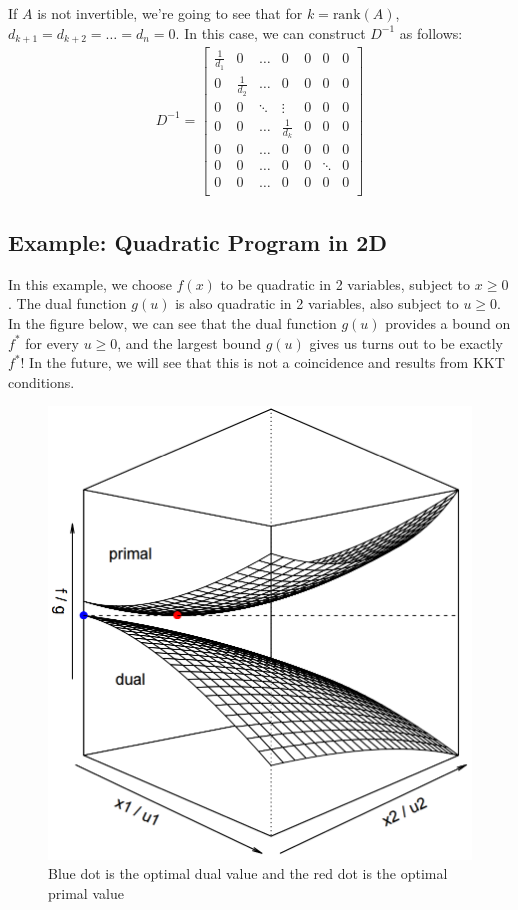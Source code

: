 \documentclass[twoside]{article}
\begin{document}
If $A$ is not invertible, we're going to see that for $k = \text{rank}(A)$,
$d_{k+1} = d_{k+2} = \dots = d_n = 0$. In this case, we can construct $D^{-1}$ as follows:
\begin{align*}
D^{-1} = \begin{bmatrix}
\frac{1}{d_1} & 0 & \dots & 0 & 0  & 0 & 0\\
0 & \frac{1}{d_2} & \dots & 0 & 0  & 0 & 0\\
0 & 0 & \ddots & \vdots & 0  & 0 & 0\\
0 & 0 & \dots & \frac{1}{d_k} & 0  & 0 & 0\\
0 & 0 & \dots & 0 & 0  & 0 & 0\\
0 & 0 & \dots & 0 & 0  & \ddots & 0\\
0 & 0 & \dots & 0 & 0  & 0 & 0\\
\end{bmatrix}
\end{align*}

\subsection{Example: Quadratic Program in 2D}
\label{sec:exampl-quadr-progr}

In this example, we choose $f(x)$ to be quadratic in 2 variables, subject to $ x \geq 0$. The dual function $g(u)$ is also quadratic in 2 variables, also subject to $u \geq 0$. In the figure below, we can see that the dual function $g(u)$ provides a bound on $f^*$ for every $u \geq 0$, and the largest bound $g(u)$ gives us turns out to be exactly $f^*$! In the future, we will see that this is not a coincidence and results from KKT conditions.

\begin{figure}[h]
  \centering
  \includegraphics[scale=0.3]{quad.png}
  \caption{Blue dot is the optimal dual value and the red dot is the optimal primal value}
  \label{fig:quad}
\end{figure}
\end{document}
